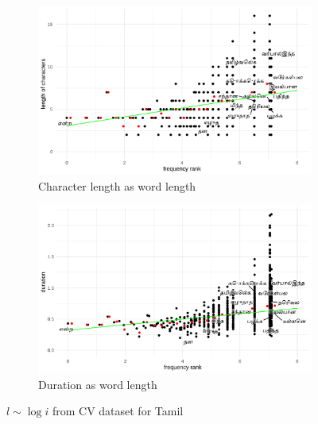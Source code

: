 \begin{figure}[H]
  \centering
  \begin{subfigure}[b]{0.48\textwidth}
    \centering
    \includegraphics[width=\textwidth]{plots/Tamil_logi_cl_CV.pdf}
    \caption{Character length as word length}
  \end{subfigure}
  \hfill
  \begin{subfigure}[b]{0.48\textwidth}
    \centering
    \includegraphics[width=\textwidth]{plots/Tamil_logi_d_CV.pdf}
    \caption{Duration as word length}
  \end{subfigure}
  \caption{$l \sim \log i$ from CV dataset for Tamil}
\end{figure}
